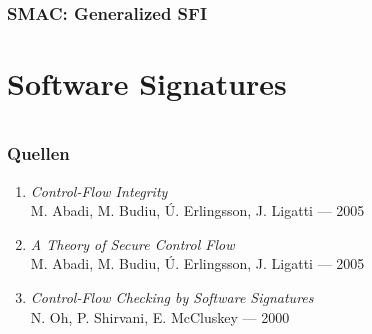 \documentclass[serif,slidestop,compress,red]{beamer}
\begin{document}
\begin{frame}
  \frametitle{SMAC: Generalized SFI}
\end{frame}

\section{Software Signatures}

\section{}

\begin{frame}
  \frametitle{Quellen}
  \begin{enumerate}
    \item \emph{Control-Flow Integrity} \\ M. Abadi, M. Budiu, Ú. Erlingsson, J. Ligatti — 2005
    \item \emph{A Theory of Secure Control Flow} \\ M. Abadi, M. Budiu, Ú. Erlingsson, J. Ligatti — 2005
    \item \emph{Control-Flow Checking by Software Signatures} \\ N. Oh, P. Shirvani, E. McCluskey — 2000
  \end{enumerate}
\end{frame}
\end{document}
